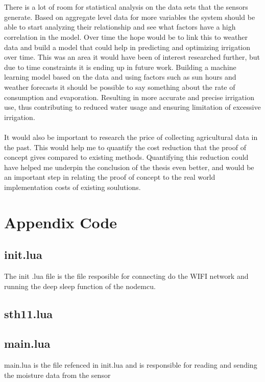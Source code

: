 \documentclass[]{uiophd}
\begin{document}
\\\\
There is a lot of room for statistical analysis on the data sets that the sensors generate. Based on aggregate level data for more variables the system should be able to start analyzing their relationship and see what factors have a high correlation in the model. Over time the hope would be to link this to weather data and build a model that could help in predicting and optimizing irrigation over time. This was an area it would have been of interest researched further, but due to time constraints it is ending up in future work. Building a machine learning model based on the data and using factors such as sun hours and weather forecasts it should be possible to say something about the rate of consumption and evaporation. Resulting in more accurate and precise irrigation use, thus contributing to reduced water usage and ensuring limitation of excessive irrigation.
\\\\
It would also be important to research the price of collecting agricultural data in the past. This would help me to quantify the cost reduction that the proof of concept gives compared to existing methods. Quantifying this reduction could have helped me underpin the conclusion of the thesis even better, and would be an important step in relating the proof of concept to the real world implementation costs of existing soulutions.

\printbibliography

\chapter{Appendix Code}
\linespread{1}

\section{init.lua}
The init .lua file is the file resposible for connecting do the WIFI network and running the deep sleep function of the nodemcu.


\section{sth11.lua}


\section{main.lua}
main.lua is the file refenced in init.lua and is responsible for reading and sending the moisture data from the sensor

\end{document}
